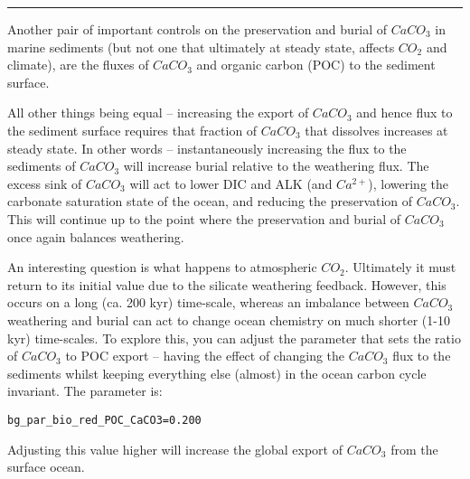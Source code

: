 \vspace{1mm}
\noindent\rule{4cm}{0.1mm}
\vspace{2mm}

\noindent Another pair of important controls on the preservation and burial of \(CaCO_{3}\) in marine sediments (but not one that ultimately at steady state, affects \(CO_{2}\) and climate), are the fluxes of \(CaCO_{3}\) and  organic carbon (POC) to the sediment surface.

All other things being equal -- increasing the export of \(CaCO_{3}\) and hence flux to the sediment surface requires that fraction of \(CaCO_{3}\) that dissolves increases at steady state. In other words -- instantaneously increasing the flux to the sediments of \(CaCO_{3}\) will increase burial relative to the weathering flux. The excess sink of \(CaCO_{3}\) will act to lower DIC and ALK (and \(Ca^{2+}\)), lowering the carbonate saturation state of the ocean, and reducing the preservation of \(CaCO_{3}\). This will continue up to the point where the preservation and burial of \(CaCO_{3}\) once again balances weathering.

An interesting question is what happens to atmospheric \(CO_{2}\). Ultimately it must return to its initial value due to the silicate weathering feedback. However, this occurs on a long (ca. 200 kyr) time-scale, whereas an imbalance between \(CaCO_{3}\) weathering and burial can act to change ocean chemistry on much shorter (1-10 kyr) time-scales. To explore this, you can adjust the parameter that sets the ratio of \(CaCO_{3}\) to POC export -- having the effect of changing the \(CaCO_{3}\) flux to the sediments whilst keeping everything else (almost) in the ocean carbon cycle invariant. The parameter is:
\vspace{-1mm}\small\begin{verbatim}
bg_par_bio_red_POC_CaCO3=0.200
\end{verbatim}\normalsize\vspace{-1mm}
Adjusting this value higher will increase the global export of \(CaCO_{3}\) from the surface ocean.

